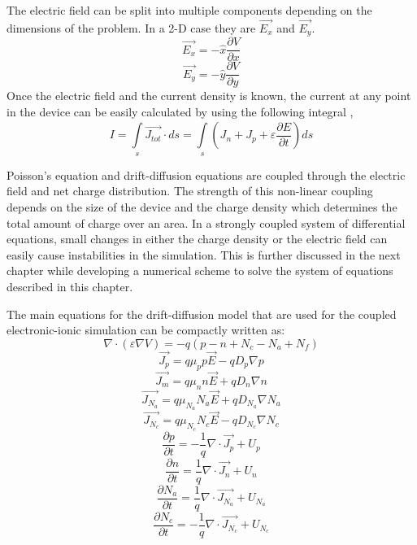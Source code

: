 \begin{doublespace}
The electric field can be split into multiple components depending on the dimensions of the problem. In a 2-D case they are $\vec{E_x}$ and $\vec{E_y}$.
\begin{equation}
\vec{E_x}=-\hat{x}\frac{\partial V}{\partial x}
\end{equation}
\begin{equation}
\vec{E_y}=-\hat{y}\frac{\partial V}{\partial y}
\end{equation}
Once the electric field and the current density is known, the current at any point in the device can be easily calculated by using the following integral \cite{snowden},
\begin{equation}
I=\int\limits_{s}^{}\vec{J_{tot}} \cdot ds = \int\limits_{s}^{}(J_n+J_p+\varepsilon\frac{\partial E}{\partial t})ds
\end{equation}

Poisson's equation and drift-diffusion equations are coupled through the electric field and net charge distribution. The strength of this non-linear coupling depends on the size of the device and the charge density which determines the total amount of charge over an area. In a strongly coupled system of differential equations, small changes in either the charge density or the electric field can easily cause instabilities in the simulation. This is further discussed in the next chapter while developing a numerical scheme to solve the system of equations described in this chapter. 

The main equations for the drift-diffusion model that are used for the coupled electronic-ionic simulation can be compactly written as:
\begin{equation}
\nabla \cdot  (\varepsilon \nabla V)=-q(p-n+N_{c}-N_{a}+N_{f})
\end{equation}
\begin{equation}
\vec{J_p}=q\mu_p p \vec{E}-q D_p \nabla p
\end{equation}
\begin{equation}
\vec{J_m}=q\mu_n n \vec{E}+q D_n \nabla n
\end{equation}
\begin{equation}
\vec{J_{N_{a}}}=q\mu_{N_{a}} N_{a} \vec{E}+q D_{N_{a}} \nabla N_{a} 
\end{equation}
\begin{equation}
\vec{J_{N_{c}}}=q\mu_{N_{c}} N_{c} \vec{E}-q D_{N_{c}} \nabla N_{c}
\end{equation}
\begin{equation}
\frac{\partial p}{\partial t}=-\frac{1}{q}\nabla \cdot \vec{J_p}  + U_{p}
\end{equation}
\begin{equation}
\frac{\partial n}{\partial t}=\frac{1}{q}\nabla \cdot \vec{J_n}+ U_{n}
\end{equation}
\begin{equation}
\frac{\partial N_{a}}{\partial t}=\frac{1}{q}\nabla \cdot \vec{J_{N_{a}}} + U_{N_{a}}
\end{equation}
\begin{equation}
\frac{\partial N_{c}}{\partial t}=-\frac{1}{q}\nabla \cdot \vec{J_{ N_{c} }}+ U_{N_{c}}
\end{equation}


\end{doublespace}
